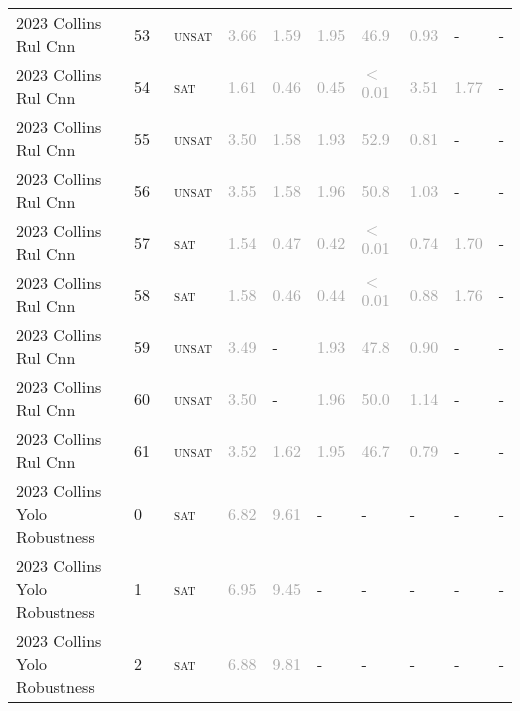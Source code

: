 \begin{center}
{\begin{longtable}{@{}llllllllll@{}}
2023 Collins Rul Cnn & 53 & ~\textsc{unsat} & \textcolor{darkgray}{3.66} & \textcolor{darkgray}{1.59} & \textcolor{darkgray}{1.95} & \textcolor{darkgray}{46.9} & \textcolor{darkgray}{0.93} & - & - \\
2023 Collins Rul Cnn & 54 & ~\textsc{sat} & \textcolor{darkgray}{1.61} & \textcolor{darkgray}{0.46} & \textcolor{darkgray}{0.45} & \textcolor{darkgray}{$<$0.01} & \textcolor{darkgray}{3.51} & \textcolor{darkgray}{1.77} & - \\
2023 Collins Rul Cnn & 55 & ~\textsc{unsat} & \textcolor{darkgray}{3.50} & \textcolor{darkgray}{1.58} & \textcolor{darkgray}{1.93} & \textcolor{darkgray}{52.9} & \textcolor{darkgray}{0.81} & - & - \\
2023 Collins Rul Cnn & 56 & ~\textsc{unsat} & \textcolor{darkgray}{3.55} & \textcolor{darkgray}{1.58} & \textcolor{darkgray}{1.96} & \textcolor{darkgray}{50.8} & \textcolor{darkgray}{1.03} & - & - \\
2023 Collins Rul Cnn & 57 & ~\textsc{sat} & \textcolor{darkgray}{1.54} & \textcolor{darkgray}{0.47} & \textcolor{darkgray}{0.42} & \textcolor{darkgray}{$<$0.01} & \textcolor{darkgray}{0.74} & \textcolor{darkgray}{1.70} & - \\
2023 Collins Rul Cnn & 58 & ~\textsc{sat} & \textcolor{darkgray}{1.58} & \textcolor{darkgray}{0.46} & \textcolor{darkgray}{0.44} & \textcolor{darkgray}{$<$0.01} & \textcolor{darkgray}{0.88} & \textcolor{darkgray}{1.76} & - \\
2023 Collins Rul Cnn & 59 & ~\textsc{unsat} & \textcolor{darkgray}{3.49} & - & \textcolor{darkgray}{1.93} & \textcolor{darkgray}{47.8} & \textcolor{darkgray}{0.90} & - & - \\
2023 Collins Rul Cnn & 60 & ~\textsc{unsat} & \textcolor{darkgray}{3.50} & - & \textcolor{darkgray}{1.96} & \textcolor{darkgray}{50.0} & \textcolor{darkgray}{1.14} & - & - \\
2023 Collins Rul Cnn & 61 & ~\textsc{unsat} & \textcolor{darkgray}{3.52} & \textcolor{darkgray}{1.62} & \textcolor{darkgray}{1.95} & \textcolor{darkgray}{46.7} & \textcolor{darkgray}{0.79} & - & - \\
\midrule
2023 Collins Yolo Robustness & 0 & ~\textsc{sat} & \textcolor{darkgray}{6.82} & \textcolor{darkgray}{9.61} & - & - & - & - & - \\
2023 Collins Yolo Robustness & 1 & ~\textsc{sat} & \textcolor{darkgray}{6.95} & \textcolor{darkgray}{9.45} & - & - & - & - & - \\
2023 Collins Yolo Robustness & 2 & ~\textsc{sat} & \textcolor{darkgray}{6.88} & \textcolor{darkgray}{9.81} & - & - & - & - & - \\

\end{longtable}}
\end{center}
